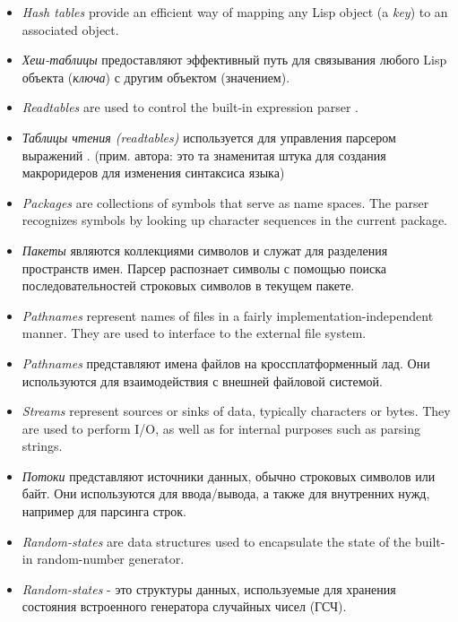 \begin{itemize}
\item
{\it Hash tables} provide an efficient way of mapping any
Lisp object (a {\it key}) to an associated object.

\item
{\it Хеш-таблицы} предоставляют эффективный путь для связывания
любого Lisp объекта ({\it ключа}) с другим объектом (значением). 

\item
{\it Readtables} are used to control the built-in expression parser
.

\item
{\it Таблицы чтения (readtables)} используется для управления
парсером выражений . (прим. автора: это та знаменитая
штука для создания макроридеров для изменения синтаксиса языка) 

\item
{\it Packages} are collections of symbols that serve as name spaces.
The parser recognizes symbols by looking up character sequences
in the current package.

\item
{\it Пакеты} являются коллекциями символов и служат для разделения
пространств имен. Парсер распознает символы с помощью поиска
последовательностей строковых символов в текущем пакете. 

\item
{\it Pathnames} represent names of files in a fairly implementation-independent
manner.  They are used to interface to the external file system.

\item
{\it Pathnames} представляют имена файлов на кроссплатформенный
лад. Они используются для взаимодействия с внешней файловой
системой. 

\item
{\it Streams} represent sources or sinks of data, typically characters
or bytes.  They are used to perform I/O, as well as for internal
purposes such as parsing strings.

\item
{\it Потоки} представляют источники данных, обычно строковых
символов или байт. Они используются для ввода/вывода, а также для
внутренних нужд, например для парсинга строк. 

\item
{\it Random-states} are data structures used to encapsulate the state
of the built-in random-number generator.

\item
{\it Random-states} - это структуры данных, используемые для
хранения состояния встроенного генератора случайных чисел (ГСЧ).


\end{itemize}
